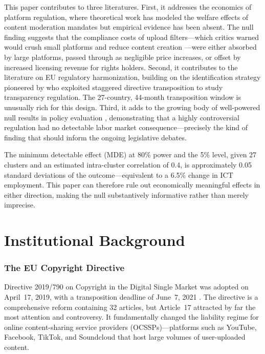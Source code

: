 \documentclass[12pt]{article}
\begin{document}
This paper contributes to three literatures. First, it addresses the economics of platform regulation, where theoretical work has modeled the welfare effects of content moderation mandates \citep{peukert2022european, husovec2020eu} but empirical evidence has been absent. The null finding suggests that the compliance costs of upload filters---which critics warned would crush small platforms and reduce content creation \citep{senftleben2020copyright}---were either absorbed by large platforms, passed through as negligible price increases, or offset by increased licensing revenue for rights holders. Second, it contributes to the literature on EU regulatory harmonization, building on the identification strategy pioneered by \citet{christensen2016capital} who exploited staggered directive transposition to study transparency regulation. The 27-country, 44-month transposition window is unusually rich for this design. Third, it adds to the growing body of well-powered null results in policy evaluation \citep{roth2023s}, demonstrating that a highly controversial regulation had no detectable labor market consequence---precisely the kind of finding that should inform the ongoing legislative debates.

The minimum detectable effect (MDE) at 80\% power and the 5\% level, given 27 clusters and an estimated intra-cluster correlation of 0.4, is approximately 0.05 standard deviations of the outcome---equivalent to a 6.5\% change in ICT employment. This paper can therefore rule out economically meaningful effects in either direction, making the null substantively informative rather than merely imprecise.


\section{Institutional Background}

\subsubsection*{The EU Copyright Directive} Directive 2019/790 on Copyright in the Digital Single Market was adopted on April~17, 2019, with a transposition deadline of June~7, 2021 \citep{eu2019copyright}. The directive is a comprehensive reform containing 32 articles, but Article~17 attracted by far the most attention and controversy. It fundamentally changed the liability regime for online content-sharing service providers (OCSSPs)---platforms such as YouTube, Facebook, TikTok, and Soundcloud that host large volumes of user-uploaded content.
\end{document}
